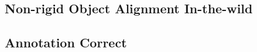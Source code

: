

\subsection{Non-rigid Object Alignment In-the-wild}
\label{exp:internal}


\subsection{Annotation Correct}
\label{exp:qualitative}



